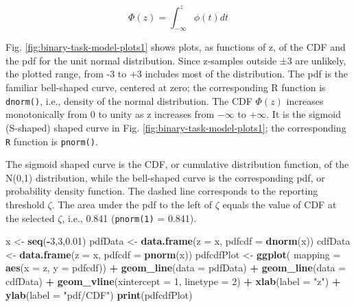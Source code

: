 \documentclass[
]{book}
\newenvironment{Shaded}{\begin{snugshade}}{\end{snugshade}}
\newcommand{\DataTypeTok}[1]{\textcolor[rgb]{0.13,0.29,0.53}{#1}}
\newcommand{\DecValTok}[1]{\textcolor[rgb]{0.00,0.00,0.81}{#1}}
\newcommand{\FloatTok}[1]{\textcolor[rgb]{0.00,0.00,0.81}{#1}}
\newcommand{\KeywordTok}[1]{\textcolor[rgb]{0.13,0.29,0.53}{\textbf{#1}}}
\newcommand{\NormalTok}[1]{#1}
\newcommand{\OperatorTok}[1]{\textcolor[rgb]{0.81,0.36,0.00}{\textbf{#1}}}
\newcommand{\StringTok}[1]{\textcolor[rgb]{0.31,0.60,0.02}{#1}}
\begin{document}
\begin{equation} 
\Phi\left ( z \right )=\int_{-\infty }^{z}\phi(t)dt
\label{eq:binary-task-model-Phi}
\end{equation}

Fig. \ref{fig:binary-task-model-plots1} shows plots, as functions of z, of the CDF and the pdf for the unit normal distribution. Since z-samples outside ±3 are unlikely, the plotted range, from -3 to +3 includes most of the distribution. The pdf is the familiar bell-shaped curve, centered at zero; the corresponding R function is \texttt{dnorm()}, i.e., density of the normal distribution. The CDF \(\Phi(z)\) increases monotonically from 0 to unity as z increases from \(-\infty\) to \(+\infty\). It is the sigmoid (S-shaped) shaped curve in Fig. \ref{fig:binary-task-model-plots1}; the corresponding \texttt{R} function is \texttt{pnorm()}.

The sigmoid shaped curve is the CDF, or cumulative distribution function, of the N(0,1) distribution, while the bell-shaped curve is the corresponding pdf, or probability density function. The dashed line corresponds to the reporting threshold \(\zeta\). The area under the pdf to the left of \(\zeta\) equals the value of CDF at the selected \(\zeta\), i.e., 0.841 (\texttt{pnorm(1)} = 0.841).

\begin{Shaded}
\begin{Highlighting}[]
\NormalTok{x <-}\StringTok{ }\KeywordTok{seq}\NormalTok{(}\OperatorTok{-}\DecValTok{3}\NormalTok{,}\DecValTok{3}\NormalTok{,}\FloatTok{0.01}\NormalTok{)}
\NormalTok{pdfData <-}\StringTok{ }\KeywordTok{data.frame}\NormalTok{(}\DataTypeTok{z =}\NormalTok{ x, }\DataTypeTok{pdfcdf =} \KeywordTok{dnorm}\NormalTok{(x))}
\NormalTok{cdfData <-}\StringTok{ }\KeywordTok{data.frame}\NormalTok{(}\DataTypeTok{z =}\NormalTok{ x, }\DataTypeTok{pdfcdf =} \KeywordTok{pnorm}\NormalTok{(x))}
\NormalTok{pdfcdfPlot <-}\StringTok{ }\KeywordTok{ggplot}\NormalTok{(}
  \DataTypeTok{mapping =} \KeywordTok{aes}\NormalTok{(}\DataTypeTok{x =}\NormalTok{ z, }\DataTypeTok{y =}\NormalTok{ pdfcdf)) }\OperatorTok{+}\StringTok{ }
\StringTok{  }\KeywordTok{geom_line}\NormalTok{(}\DataTypeTok{data =}\NormalTok{ pdfData) }\OperatorTok{+}\StringTok{ }
\StringTok{  }\KeywordTok{geom_line}\NormalTok{(}\DataTypeTok{data =}\NormalTok{ cdfData) }\OperatorTok{+}
\StringTok{  }\KeywordTok{geom_vline}\NormalTok{(}\DataTypeTok{xintercept =} \DecValTok{1}\NormalTok{, }\DataTypeTok{linetype =} \DecValTok{2}\NormalTok{) }\OperatorTok{+}\StringTok{ }
\StringTok{  }\KeywordTok{xlab}\NormalTok{(}\DataTypeTok{label =} \StringTok{"z"}\NormalTok{) }\OperatorTok{+}\StringTok{ }\KeywordTok{ylab}\NormalTok{(}\DataTypeTok{label =} \StringTok{"pdf/CDF"}\NormalTok{)}
\KeywordTok{print}\NormalTok{(pdfcdfPlot)}
\end{Highlighting}
\end{Shaded}
\end{document}
